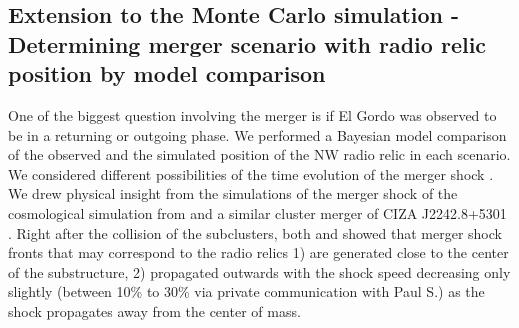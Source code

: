 \subsection{Extension to the Monte Carlo simulation - Determining merger
scenario with radio relic position by model comparison}
%

One of the biggest question involving the merger is if El Gordo was
observed to be in a returning or outgoing phase.
We performed a Bayesian model comparison of the observed and the
simulated position of the NW radio relic in each scenario.
We considered different possibilities of the time evolution of the merger shock
.  We drew physical insight from the
simulations of the merger shock of the cosmological simulation from
\citet{Paul2011b} and a similar cluster merger of CIZA J2242.8+5301
\citep{VanWeerenRJ2011}. 
Right after the collision of the subclusters, both \citet{Paul2011b} and
\citet{VanWeerenRJ2011} showed that
merger shock fronts that may correspond to the radio relics 1) are generated
close to the center of the substructure, 2) propagated outwards with  
 the shock speed decreasing only slightly (between 10\% to 30\% via private
 communication with Paul S.) as the
 shock propagates away from the center of mass.  
\par  

